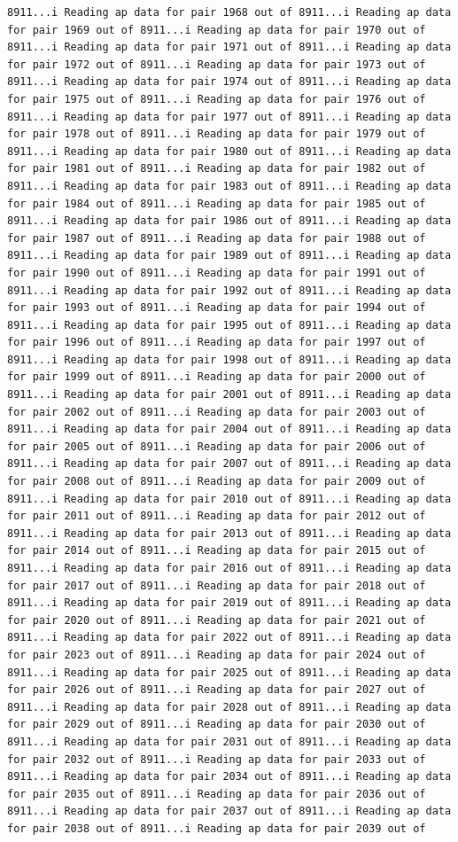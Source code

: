 \documentclass[
]{article}
\begin{document}
\begin{verbatim}
8911...i Reading ap data for pair 1968 out of 8911...i Reading ap data for pair 1969 out of 8911...i Reading ap data for pair 1970 out of 8911...i Reading ap data for pair 1971 out of 8911...i Reading ap data for pair 1972 out of 8911...i Reading ap data for pair 1973 out of 8911...i Reading ap data for pair 1974 out of 8911...i Reading ap data for pair 1975 out of 8911...i Reading ap data for pair 1976 out of 8911...i Reading ap data for pair 1977 out of 8911...i Reading ap data for pair 1978 out of 8911...i Reading ap data for pair 1979 out of 8911...i Reading ap data for pair 1980 out of 8911...i Reading ap data for pair 1981 out of 8911...i Reading ap data for pair 1982 out of 8911...i Reading ap data for pair 1983 out of 8911...i Reading ap data for pair 1984 out of 8911...i Reading ap data for pair 1985 out of 8911...i Reading ap data for pair 1986 out of 8911...i Reading ap data for pair 1987 out of 8911...i Reading ap data for pair 1988 out of 8911...i Reading ap data for pair 1989 out of 8911...i Reading ap data for pair 1990 out of 8911...i Reading ap data for pair 1991 out of 8911...i Reading ap data for pair 1992 out of 8911...i Reading ap data for pair 1993 out of 8911...i Reading ap data for pair 1994 out of 8911...i Reading ap data for pair 1995 out of 8911...i Reading ap data for pair 1996 out of 8911...i Reading ap data for pair 1997 out of 8911...i Reading ap data for pair 1998 out of 8911...i Reading ap data for pair 1999 out of 8911...i Reading ap data for pair 2000 out of 8911...i Reading ap data for pair 2001 out of 8911...i Reading ap data for pair 2002 out of 8911...i Reading ap data for pair 2003 out of 8911...i Reading ap data for pair 2004 out of 8911...i Reading ap data for pair 2005 out of 8911...i Reading ap data for pair 2006 out of 8911...i Reading ap data for pair 2007 out of 8911...i Reading ap data for pair 2008 out of 8911...i Reading ap data for pair 2009 out of 8911...i Reading ap data for pair 2010 out of 8911...i Reading ap data for pair 2011 out of 8911...i Reading ap data for pair 2012 out of 8911...i Reading ap data for pair 2013 out of 8911...i Reading ap data for pair 2014 out of 8911...i Reading ap data for pair 2015 out of 8911...i Reading ap data for pair 2016 out of 8911...i Reading ap data for pair 2017 out of 8911...i Reading ap data for pair 2018 out of 8911...i Reading ap data for pair 2019 out of 8911...i Reading ap data for pair 2020 out of 8911...i Reading ap data for pair 2021 out of 8911...i Reading ap data for pair 2022 out of 8911...i Reading ap data for pair 2023 out of 8911...i Reading ap data for pair 2024 out of 8911...i Reading ap data for pair 2025 out of 8911...i Reading ap data for pair 2026 out of 8911...i Reading ap data for pair 2027 out of 8911...i Reading ap data for pair 2028 out of 8911...i Reading ap data for pair 2029 out of 8911...i Reading ap data for pair 2030 out of 8911...i Reading ap data for pair 2031 out of 8911...i Reading ap data for pair 2032 out of 8911...i Reading ap data for pair 2033 out of 8911...i Reading ap data for pair 2034 out of 8911...i Reading ap data for pair 2035 out of 8911...i Reading ap data for pair 2036 out of 8911...i Reading ap data for pair 2037 out of 8911...i Reading ap data for pair 2038 out of 8911...i Reading ap data for pair 2039 out of 
\end{verbatim}
\end{document}
